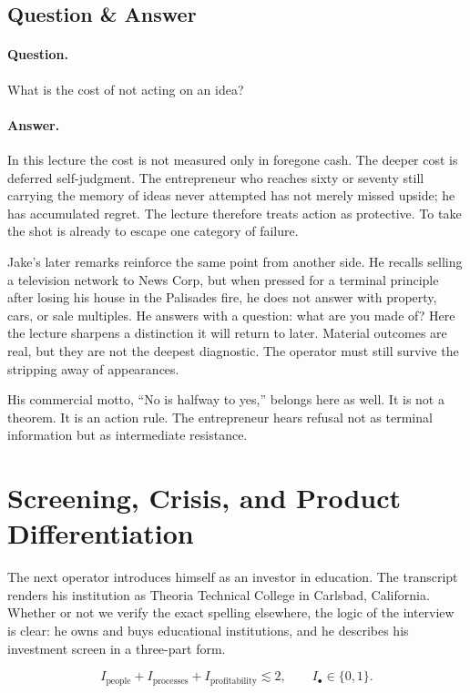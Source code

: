 \subsection{Question \& Answer}

\paragraph{Question.} What is the cost of not acting on an idea?

\paragraph{Answer.} In this lecture the cost is not measured only in foregone cash. The deeper cost is deferred self-judgment. The entrepreneur who reaches sixty or seventy still carrying the memory of ideas never attempted has not merely missed upside; he has accumulated regret. The lecture therefore treats action as protective. To take the shot is already to escape one category of failure.

Jake's later remarks reinforce the same point from another side. He recalls selling a television network to News Corp, but when pressed for a terminal principle after losing his house in the Palisades fire, he does not answer with property, cars, or sale multiples. He answers with a question: what are you made of? Here the lecture sharpens a distinction it will return to later. Material outcomes are real, but they are not the deepest diagnostic. The operator must still survive the stripping away of appearances.

His commercial motto, ``No is halfway to yes,'' belongs here as well. It is not a theorem. It is an action rule. The entrepreneur hears refusal not as terminal information but as intermediate resistance.

\section{Screening, Crisis, and Product Differentiation}

The next operator introduces himself as an investor in education. The transcript renders his institution as Theoria Technical College in Carlsbad, California. Whether or not we verify the exact spelling elsewhere, the logic of the interview is clear: he owns and buys educational institutions, and he describes his investment screen in a three-part form.

\begin{equation}
I_{\mathrm{people}} + I_{\mathrm{processes}} + I_{\mathrm{profitability}} \lesssim 2,
\qquad
I_{\bullet} \in \{0,1\}.
\end{equation}

